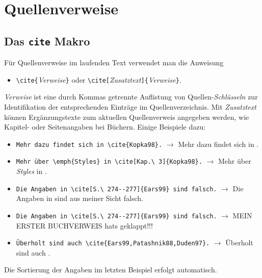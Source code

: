 \section{Quellenverweise}

\subsection{Das {\tt {\bs}cite} Makro}

Für Quellenverweise im laufenden Text verwendet man die Anweisung
\begin{itemize}
\item[] \verb!\cite{!\textit{Verweise}\verb!}! 
				\quad oder \quad
        \verb!\cite[!\textit{Zusatztext}\verb!]{!\textit{Verweise}\verb!}!.
\end{itemize}

\noindent%
\textit{Verweise} ist eine durch Kommas getrennte Auflistung von Quellen-\emph{Schlüsseln}
zur Identifikation der entsprechenden Einträge im Quellenverzeichnis.
Mit \textit{Zusatztext} können Ergänzungstexte zum aktuellen Quellenverweis angegeben
werden, wie \zB Kapitel- oder Seitenangaben bei Büchern.
Einige Beispiele dazu:
\begin{itemize}
\item[] \verb!Mehr dazu findet sich in \cite{Kopka98}.! \newline
      $\rightarrow$ Mehr dazu findet sich in \cite{Kopka98}.
\item[] \verb!Mehr über \emph{Styles} in \cite[Kap.\ 3]{Kopka98}.! \newline
      $\rightarrow$ Mehr über \emph{Styles} in \cite[Kap.\ 3]{Kopka98}.
\item[] \verb!Die Angaben in \cite[S.\ 274--277]{Ears99} sind falsch.! \newline
      $\rightarrow$ Die Angaben in \cite[S.\ 274--277]{Rieder03} sind aus meiner Sicht falsch.
\item[] \verb!Die Angaben in \cite[S.\ 274--277]{Ears99} sind falsch.! \newline
	  $\rightarrow$ MEIN ERSTER BUCHVERWEIS \cite{Rieder03} hats geklappt!!!
\item[] \verb!Überholt sind auch \cite{Ears99,Patashnik88,Duden97}.! \newline
      $\rightarrow$ Überholt sind auch \cite{Ears99,Patashnik88,Duden97}.
\end{itemize}
Die Sortierung der Angaben im letzten Beispiel erfolgt automatisch.



